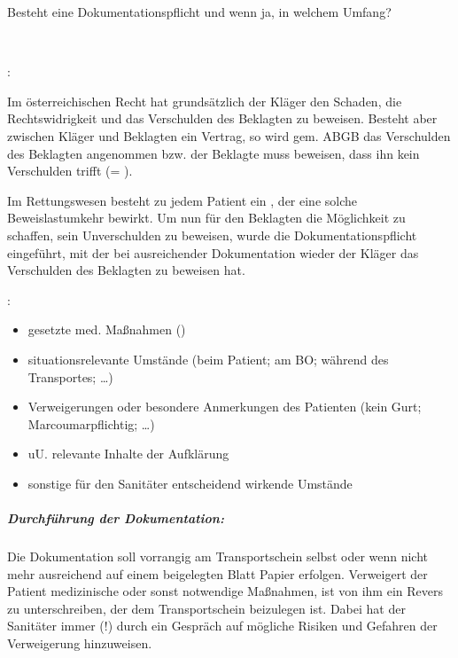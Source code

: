 Besteht eine Dokumentationspflicht und wenn ja, in welchem Umfang?

~



:

Im österreichischen Recht hat grundsätzlich der Kläger den
Schaden, die Rechtswidrigkeit und das Verschulden des Beklagten zu
beweisen. Besteht aber zwischen Kläger und Beklagten ein Vertrag, so
wird gem.  ABGB das Verschulden des Beklagten
angenommen bzw. der Beklagte muss beweisen, dass ihn kein Verschulden trifft (=
).

Im Rettungswesen besteht zu jedem Patient ein , der eine
solche Beweislastumkehr bewirkt. Um nun für den Beklagten die
Möglichkeit zu schaffen, sein Unverschulden zu beweisen, wurde die
Dokumentationspflicht eingeführt, mit der bei ausreichender
Dokumentation wieder der Kläger das Verschulden des Beklagten zu
beweisen hat.


:

\begin{itemize}
    \item gesetzte med. Maßnahmen
    ()
    \item situationsrelevante Umstände (beim Patient; am BO; während des
    Transportes; {\dots})
    \item Verweigerungen oder besondere Anmerkungen des Patienten	(kein Gurt; Marcoumarpflichtig; {\dots})
       \item uU. relevante Inhalte der Aufklärung
       \item sonstige für den Sanitäter entscheidend wirkende Umstände
\end{itemize}



\subparagraph{Durchführung der Dokumentation:}
Die Dokumentation soll vorrangig am Transportschein selbst oder wenn
nicht mehr ausreichend auf einem beigelegten Blatt Papier erfolgen.
Verweigert der Patient medizinische oder sonst notwendige
Maßnahmen, ist von ihm ein Revers zu unterschreiben, der dem
Transportschein beizulegen ist. Dabei hat der Sanitäter
immer (!) durch ein Gespräch auf mögliche Risiken und Gefahren der
Verweigerung hinzuweisen.

